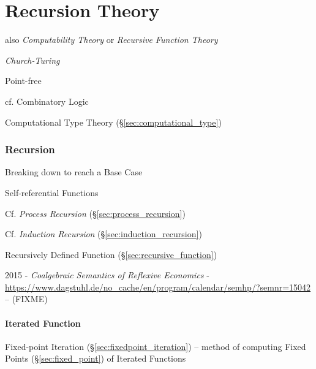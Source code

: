 \part{Recursion Theory}\label{part:recursion_theory}\cite{czoo14}

also \emph{Computability Theory} or \emph{Recursive Function Theory}

\emph{Church-Turing}

Point-free

\fist cf. Combinatory Logic

\fist Computational Type Theory (\S\ref{sec:computational_type})



\section{Recursion}\label{sec:recursion}

Breaking down to reach a Base Case

Self-referential Functions

\fist Cf. \emph{Process Recursion} (\S\ref{sec:process_recursion})

\fist Cf. \emph{Induction Recursion} (\S\ref{sec:induction_recursion})

\fist Recursively Defined Function (\S\ref{sec:recursive_function})

\asterism

2015 - \emph{Coalgebraic Semantics of Reflexive Economics} -
\url{https://www.dagstuhl.de/no_cache/en/program/calendar/semhp/?semnr=15042} --
(FIXME)



\subsection{Iterated Function}\label{sec:iterated_function}

Fixed-point Iteration (\S\ref{sec:fixedpoint_iteration}) -- method of computing
Fixed Points (\S\ref{sec:fixed_point}) of Iterated Functions

